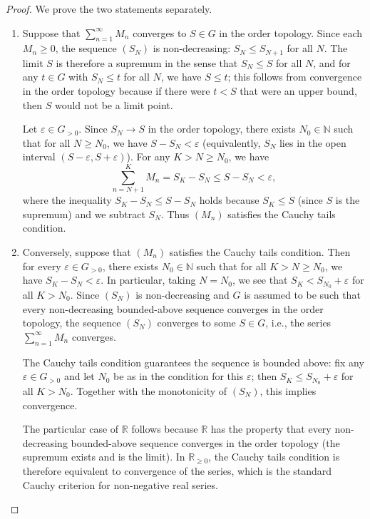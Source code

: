 \begin{proof}
    We prove the two statements separately.

    \begin{enumerate}
        \item Suppose that $\sum_{n=1}^\infty M_n$ converges to $S \in G$ in the order topology. Since each $M_n \ge 0$, the sequence $(S_N)$ is non-decreasing: $S_N \le S_{N+1}$ for all $N$. The limit $S$ is therefore a supremum in the sense that $S_N \le S$ for all $N$, and for any $t \in G$ with $S_N \le t$ for all $N$, we have $S \le t$; this follows from convergence in the order topology because if there were $t < S$ that were an upper bound, then $S$ would not be a limit point.

        Let $\varepsilon \in G_{>0}$. Since $S_N \to S$ in the order topology, there exists $N_0 \in \mathbb{N}$ such that for all $N \ge N_0$, we have $S - S_N < \varepsilon$ (equivalently, $S_N$ lies in the open interval $(S - \varepsilon, S + \varepsilon)$). For any $K > N \ge N_0$, we have
        $$\sum_{n=N+1}^K M_n = S_K - S_N \le S - S_N < \varepsilon,$$
        where the inequality $S_K - S_N \le S - S_N$ holds because $S_K \le S$ (since $S$ is the supremum) and we subtract $S_N$. Thus $(M_n)$ satisfies the Cauchy tails condition.

        \item Conversely, suppose that $(M_n)$ satisfies the Cauchy tails condition. Then for every $\varepsilon \in G_{>0}$, there exists $N_0 \in \mathbb{N}$ such that for all $K > N \ge N_0$, we have $S_K - S_N < \varepsilon$. In particular, taking $N = N_0$, we see that $S_K < S_{N_0} + \varepsilon$ for all $K > N_0$. Since $(S_N)$ is non-decreasing and $G$ is assumed to be such that every non-decreasing bounded-above sequence converges in the order topology, the sequence $(S_N)$ converges to some $S \in G$, i.e., the series $\sum_{n=1}^\infty M_n$ converges.

        The Cauchy tails condition guarantees the sequence is bounded above: fix any $\varepsilon \in G_{>0}$ and let $N_0$ be as in the condition for this $\varepsilon$; then $S_K \le S_{N_0} + \varepsilon$ for all $K > N_0$. Together with the monotonicity of $(S_N)$, this implies convergence.

        The particular case of $\mathbb{R}$ follows because $\mathbb{R}$ has the property that every non-decreasing bounded-above sequence converges in the order topology (the supremum exists and is the limit). In $\mathbb{R}_{\ge 0}$, the Cauchy tails condition is therefore equivalent to convergence of the series, which is the standard Cauchy criterion for non-negative real series.
    \end{enumerate}
\end{proof}